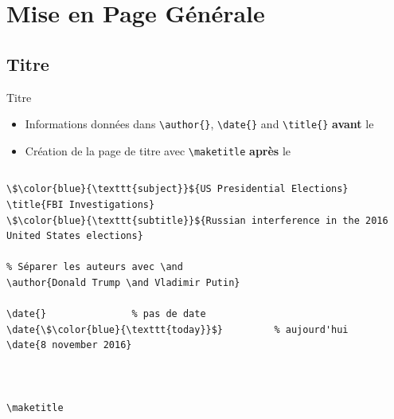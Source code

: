 \section{Mise en Page Générale}

\subsection{Titre}

\begin{frame}[fragile]{Titre}
  \begin{itemize}
      \item Informations données dans \lstinline|\author{}|, \lstinline|\date{}| and \lstinline|\title{}| \textbf{avant} le \lstinline||
      \item Création de la page de titre avec \lstinline|\maketitle| \textbf{après} le \lstinline||
  \end{itemize}
  \begin{columns}
    \begin{column}{0.5\textwidth}
      \begin{lstlisting}[style=nonumbers,mathescape]
\$\color{blue}{\texttt{subject}}${US Presidential Elections}
\title{FBI Investigations}
\$\color{blue}{\texttt{subtitle}}${Russian interference in the 2016 United States elections}

% Séparer les auteurs avec \and
\author{Donald Trump \and Vladimir Putin}

\date{}               % pas de date
\date{\$\color{blue}{\texttt{today}}$}         % aujourd'hui
\date{8 november 2016}



\maketitle



\end{lstlisting}
\end{column}
\end{columns}
\end{frame}
